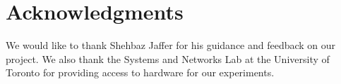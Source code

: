 \section*{Acknowledgments}
We would like to thank Shehbaz Jaffer for his guidance and feedback on our
project. We also thank the Systems and Networks Lab at the University of
Toronto for providing access to hardware for our experiments.
